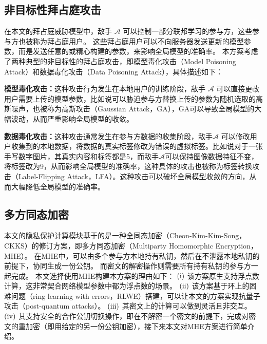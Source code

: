 \subsection{非目标性拜占庭攻击}
在本文的拜占庭威胁模型中，敌手 $\mathcal{A}$ 可以控制一部分联邦学习的参与方，这些参与方也被称为拜占庭用户。
这些拜占庭用户可以不向服务器发送更新的模型参数，而是发送任意的或精心构建的参数，来影响全局模型的准确率。
本方案考虑了两种典型的非目标性的拜占庭攻击，即模型毒化攻击（Model Poisoning Attack）和数据毒化攻击（Data Poisoning Attack），具体描述如下：
\begin{compactitem}
	\item \textbf{模型毒化攻击：}这种攻击行为发生在本地用户的训练阶段，敌手 $\mathcal{A}$ 可以直接更改用户需要上传的模型参数，比如说可以胁迫参与方替换上传的参数为随机选取的高斯噪声，也被称为高斯攻击（Gaussian Attack，GA）\cite{blanchard2017machine, dong2021flod}，GA可以导致全局模型的大幅波动，从而严重影响全局模型的收敛。
	\item  \textbf{数据毒化攻击：}这种攻击通常发生在参与方数据的收集阶段，敌手$\mathcal{A}$ 可以修改用户收集到的本地数据，将数据的真实标签修改为错误的虚拟标签。比如说对于一张手写数字图片，其真实内容和标签都是5，而敌手$\mathcal{A}$可以保持图像数据特征不变，将标签改为9，从而影响全局模型的准确率，这种具体的攻击也被称为标签转换攻击（Label-Flipping Attack，LFA）\cite{kairouz2019advances, dong2021flod, liu2021privacy}。这种攻击可以破坏全局模型收敛的方向，从而大幅降低全局模型的准确率。
\end{compactitem}

\subsection{多方同态加密}
本文的隐私保护计算模块基于的是一种全同态加密（Cheon-Kim-Kim-Song，CKKS\cite{cheon2017homomorphic}）的修订方案，即多方同态加密（Multiparty Homomorphic Encryption，MHE）。
在MHE中，可以由多个参与方本地持有私钥，然后在不泄露本地私钥的前提下，协同生成一份公钥。
而密文的解密操作则需要所有持有私钥的参与方一起完成。
本文选择使用MHE构建本方案的理由如下：
$(\rm \romannumeral1)$ 该方案原生支持浮点数计算，这非常契合网络模型参数中都为浮点数的场景。
$(\rm \romannumeral2)$ 该方案基于环上的困难问题（ring learning with errors，RLWE）搭建，可以让本文的方案实现抗量子攻击（post-quantum attacks）。
$(\rm \romannumeral3)$ 其密文上的计算可以做到灵活且非交互。
$(\rm \romannumeral4)$ 其支持安全的合作公钥切换操作，即在不解密一个密文的前提下，完成对密文的重加密（即用给定的另一份公钥加密），接下来本文对MHE方案进行简单介绍。

